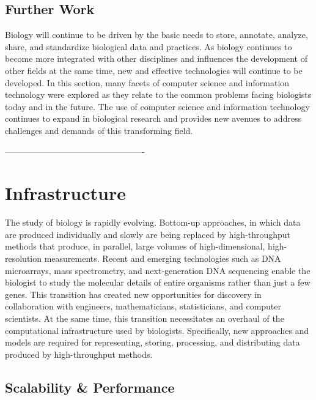 \subsection{Further Work}

Biology will continue to be driven by the basic needs to store, annotate,
analyze, share, and standardize biological data and practices. As biology
continues to become more integrated with other disciplines and influences the
development of other fields at the same time, new and effective technologies
will continue to be developed. In this section, many facets of computer science
and information technology were explored as they relate to the common problems
facing biologists today and in the future.  The use of computer science and
information technology continues to expand in biological research and provides
new avenues to address challenges and demands of this transforming field.

-------------------------------------------------

\section{Infrastructure}
\label{Infrastructure}

The study of biology is rapidly evolving.  Bottom-up approaches, in which data
are produced individually and slowly are being replaced by high-throughput
methods that produce, in parallel, large volumes of high-dimensional,
high-resolution measurements.  Recent and emerging technologies such as DNA
microarrays, mass spectrometry, and next-generation DNA sequencing enable the
biologist to study the molecular details of entire organisms rather than just a
few genes.  This transition has created new opportunities for discovery in
collaboration with engineers, mathematicians, statisticians, and computer
scientists.  At the same time, this transition necessitates an overhaul of the
computational infrastructure used by biologists.  Specifically, new approaches and
models are required for representing, storing, processing, and distributing
data produced by high-throughput methods.

\subsection{Scalability \& Performance}
\label{Scalability}


